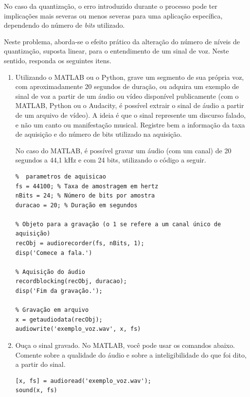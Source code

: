 \documentclass[12pt,a4paper]{article}
\begin{document}
No caso da quantização, o erro introduzido durante o processo pode ter implicações mais severas ou
menos severas para uma aplicação específica, dependendo do número de \textit{bits} utilizado.

Neste problema, aborda-se o efeito prático da alteração do número de níveis de quantização,
suposta linear, para o entendimento de um sinal de voz. Neste sentido, responda os seguintes itens.

\begin{enumerate}
  \item Utilizando o MATLAB ou o Python, grave um segmento de sua própria voz, com aproximadamente
        20 segundos de duração, ou adquira um exemplo de sinal de voz a partir de um áudio ou
        vídeo disponível publicamente (com o MATLAB, Python ou o Audacity, é possível extrair o
        sinal de áudio a partir de um arquivo de vídeo). A ideia é que o sinal represente um
        discurso falado, e não um canto ou manifestação musical. Registre bem a informação da taxa
        de aquisição e do número de bits utilizado na aquisição.

        No caso do MATLAB, é possível gravar um áudio (com um canal) de 20 segundos a 44,1 kHz e
        com 24 bits, utilizando o código a seguir.

\begin{lstlisting}
%  parametros de aquisicao
fs = 44100; % Taxa de amostragem em hertz
nBits = 24; % Número de bits por amostra
duracao = 20; % Duração em segundos

% Objeto para a gravação (o 1 se refere a um canal único de aquisição)
recObj = audiorecorder(fs, nBits, 1);
disp('Comece a fala.')

% Aquisição do áudio
recordblocking(recObj, duracao);
disp('Fim da gravação.');

% Gravação em arquivo
x = getaudiodata(recObj);
audiowrite('exemplo_voz.wav', x, fs)
\end{lstlisting}

  \item Ouça o sinal gravado. No MATLAB, você pode usar os comandos abaixo. Comente sobre a
        qualidade do áudio e sobre a inteligibilidade do que foi dito, a partir do sinal.

\begin{lstlisting}
[x, fs] = audioread('exemplo_voz.wav');
sound(x, fs)
\end{lstlisting}


\end{enumerate}
\end{document}
